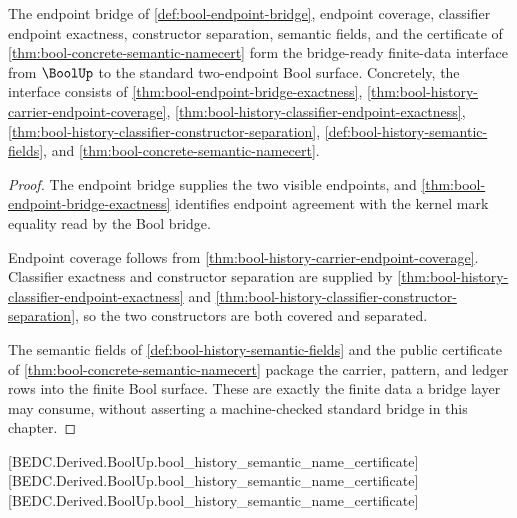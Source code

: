 \begin{theorem}
\label{thm:bool-finite-data-bridge-interface}
The endpoint bridge of \autoref{def:bool-endpoint-bridge}, endpoint coverage,
classifier endpoint exactness, constructor separation, semantic fields, and the
certificate of \autoref{thm:bool-concrete-semantic-namecert} form the
bridge-ready finite-data interface from $\BoolUp$ to the standard two-endpoint
Bool surface. Concretely, the interface consists of
\autoref{thm:bool-endpoint-bridge-exactness},
\autoref{thm:bool-history-carrier-endpoint-coverage},
\autoref{thm:bool-history-classifier-endpoint-exactness},
\autoref{thm:bool-history-classifier-constructor-separation},
\autoref{def:bool-history-semantic-fields}, and
\autoref{thm:bool-concrete-semantic-namecert}.
\end{theorem}
\begin{proof}
The endpoint bridge supplies the two visible endpoints, and
\autoref{thm:bool-endpoint-bridge-exactness} identifies endpoint agreement
with the kernel mark equality read by the Bool bridge.

Endpoint coverage follows from
\autoref{thm:bool-history-carrier-endpoint-coverage}. Classifier exactness and
constructor separation are supplied by
\autoref{thm:bool-history-classifier-endpoint-exactness} and
\autoref{thm:bool-history-classifier-constructor-separation}, so the two
constructors are both covered and separated.

The semantic fields of \autoref{def:bool-history-semantic-fields} and the
public certificate of \autoref{thm:bool-concrete-semantic-namecert} package the
carrier, pattern, and ledger rows into the finite Bool surface. These are
exactly the finite data a bridge layer may consume, without asserting a
machine-checked standard bridge in this chapter.
\end{proof}

[BEDC.Derived.BoolUp.bool\_history\_semantic\_name\_certificate]
[BEDC.Derived.BoolUp.bool\_history\_semantic\_name\_certificate]
[BEDC.Derived.BoolUp.bool\_history\_semantic\_name\_certificate]

